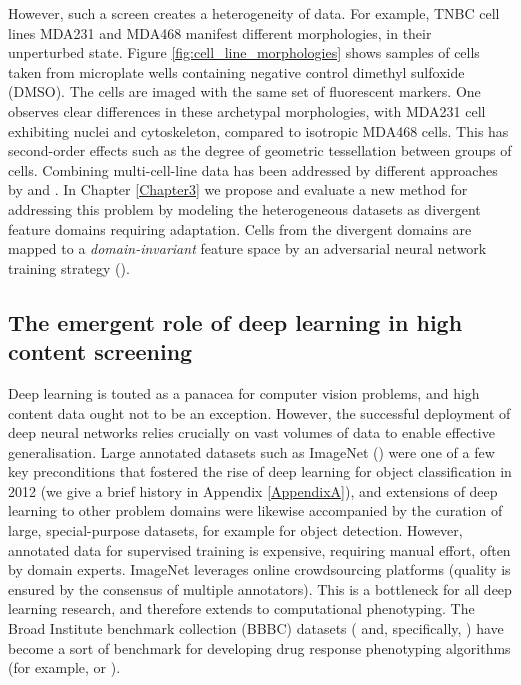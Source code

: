 However, such a screen creates a heterogeneity of data. For example, TNBC cell lines MDA231 and MDA468 manifest different morphologies, in their unperturbed state. Figure \ref{fig:cell_line_morphologies} shows samples of cells taken from microplate wells containing negative control dimethyl sulfoxide (DMSO). The cells are imaged with the same set of fluorescent markers. One observes clear differences in these archetypal morphologies, with MDA231 cell exhibiting nuclei and cytoskeleton, compared to isotropic MDA468 cells. This has second-order effects such as the degree of geometric tessellation   between groups of cells. Combining multi-cell-line data  has been addressed by different approaches by \cite{rose2018compound} and \cite{warchal2016development}. In Chapter \ref{Chapter3} we propose and evaluate a new method for addressing this problem by modeling the heterogeneous datasets as divergent feature domains requiring adaptation. Cells from the divergent domains are mapped to a \emph{domain-invariant} feature space by an adversarial neural network training strategy (\cite{ajakan2014domain}).

\subsection{The emergent role of deep learning in high content screening}

Deep learning is touted as a panacea for computer vision problems, and high content data ought not to be an exception. However, the successful deployment of deep neural networks relies crucially on vast volumes of data to enable effective generalisation. Large annotated datasets such as ImageNet (\cite{russakovsky2015imagenet}) were one of a few key preconditions that fostered the rise of deep learning for object classification in 2012 (we give a brief history in Appendix \ref{AppendixA}), and extensions of deep learning to other problem domains were likewise accompanied by the curation of large, special-purpose datasets, for example \cite{lin2014microsoft} for object detection. However, annotated data for supervised training is expensive, requiring manual effort, often by domain experts. ImageNet leverages online crowdsourcing platforms (quality is ensured by the consensus of multiple annotators). This is a bottleneck for all deep learning research, and therefore extends to computational phenotyping. The Broad Institute benchmark collection (BBBC) datasets (\cite{ljosa2012annotated} and, specifically, \cite{caie2010high}) have become a sort of benchmark for developing drug response phenotyping algorithms (for example, \cite{kraus2016classifying} or \cite{kandaswamy2016high}).

